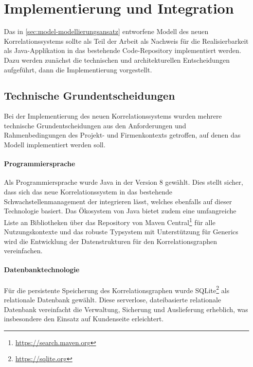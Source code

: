 \section{Implementierung und Integration}\label{sec:implementierung}

Das in \autoref{sec:model-modellierungsansatz} entworfene Modell des neuen Korrelationssystems sollte als Teil der Arbeit als Nachweis für die Realisierbarkeit als Java-Applikation in das bestehende Code-Repository implementiert werden.
Dazu werden zunächst die technischen und architekturellen Entscheidungen aufgeführt, dann die Implementierung vorgestellt.

\subsection{Technische Grundentscheidungen}\label{subsec:impl-tech-choices}

Bei der Implementierung des neuen Korrelationssystems wurden mehrere technische Grundentscheidungen aus den Anforderungen und Rahmenbedingungen des Projekt- und Firmenkontexts getroffen, auf denen das Modell implementiert werden soll.

\paragraph{Programmiersprache}

Als Programmiersprache wurde Java in der Version 8 gewählt.
Dies stellt sicher, dass sich das neue Korrelationssystem in das bestehende Schwachstellenmanagement der \metaeffektsp integrieren lässt, welches ebenfalls auf dieser Technologie basiert.
Das Ökosystem von Java bietet zudem eine umfangreiche Liste an Bibliotheken über das Repository von Maven Central\footnote{\url{https://search.maven.org}} für alle Nutzungskontexte und das robuste Typsystem mit Unterstützung für Generics wird die Entwicklung der Datenstrukturen für den Korrelationsgraphen vereinfachen.

\paragraph{Datenbanktechnologie}

Für die persistente Speicherung des Korrelationsgraphen wurde SQLite\footnote{\url{https://sqlite.org}} als relationale Datenbank gewählt.
Diese serverlose, dateibasierte relationale Datenbank vereinfacht die Verwaltung, Sicherung und Auslieferung erheblich, was insbesondere den Einsatz auf Kundenseite erleichtert.

